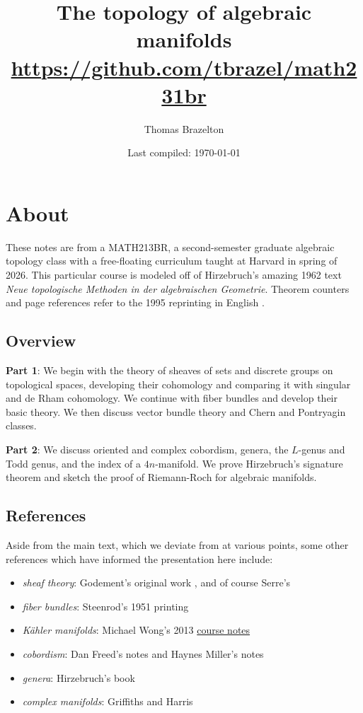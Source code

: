 \documentclass[11pt]{book}
\title{The topology of algebraic manifolds \\
\url{https://github.com/tbrazel/math231br}}
\author{Thomas Brazelton}
\date{Last compiled: \today}
\begin{document}

\maketitle

\section{About}

These notes are from a MATH213BR, a second-semester graduate algebraic topology class with a free-floating curriculum taught at Harvard in spring of 2026. This particular course is modeled off of Hirzebruch's amazing 1962 text \emph{Neue topologische Methoden in der algebraischen Geometrie}. Theorem counters and page references refer to the 1995 reprinting in English \cite{Hirzebruch}.

\subsection{Overview}

\textbf{Part 1}: We begin with the theory of sheaves of sets and discrete groups on topological spaces, developing their cohomology and comparing it with singular and de Rham cohomology. We continue with fiber bundles and develop their basic theory. We then discuss vector bundle theory and Chern and Pontryagin classes. 

\textbf{Part 2}: We discuss oriented and complex cobordism, genera, the $L$-genus and Todd genus, and the index of a $4n$-manifold. We prove Hirzebruch's signature theorem and sketch the proof of Riemann-Roch for algebraic manifolds.


\subsection{References}
Aside from the main text, which we deviate from at various points, some other references which have informed the presentation here include:
\begin{itemize}
    \item \emph{sheaf theory}: Godement's original work \cite{godementTopologieAlgebriqueTheorie1958}, and of course Serre's \cite{FAC}
    \item \emph{fiber bundles}: Steenrod's 1951 printing \cite{Steenrod-fibre-bundles}
    \item \emph{K\"{a}hler manifolds}: Michael Wong's 2013 \href{https://wiki.epfl.ch/kaehler2013/notesexercises}{course notes}
    \item \emph{cobordism}: Dan Freed's notes \cite{Freed-bordism} and Haynes Miller's notes \cite{millerNotesCobordism}
    \item \emph{genera}: Hirzebruch's book \cite{MMF}
    \item \emph{complex manifolds}: Griffiths and Harris \cite{griffithsPrinciplesAlgebraicGeometry1978}
\end{itemize}
\end{document}
